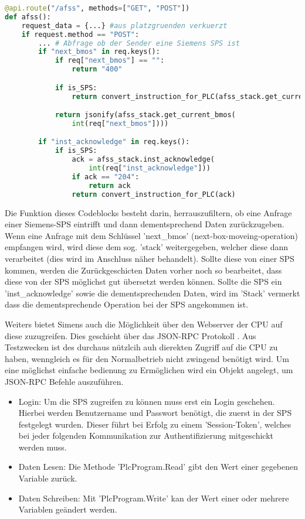 \begin{lstlisting}[language=Python]
@api.route("/afss", methods=["GET", "POST"])
def afss():   
    request_data = {...} #aus platzgruenden verkuerzt
    if request.method == "POST":
        ... # Abfrage ob der Sender eine Siemens SPS ist
        if "next_bmos" in req.keys():
            if req["next_bmos"] == "":
                return "400"

            if is_SPS:
                return convert_instruction_for_PLC(afss_stack.get_current_bmos(int(req["next_bmos"])))

            return jsonify(afss_stack.get_current_bmos(
                int(req["next_bmos"])))

        if "inst_acknowledge" in req.keys():
            if is_SPS:
                ack = afss_stack.inst_acknowledge(
                    int(req["inst_acknowledge"]))
                if ack == "204":
                    return ack
                return convert_instruction_for_PLC(ack)
\end{lstlisting}  

Die Funktion dieses Codeblocks besteht darin, herrauszufiltern, ob eine Anfrage einer Siemens-SPS eintrifft und dann dementsprechend Daten zurückzugeben.
Wenn eine Anfrage mit dem Schlüssel 'next\_bmos' (next-box-moveing-operation) empfangen wird, wird diese dem sog. 'stack' weitergegeben, welcher diese dann verarbeitet (dies wird im Anschluss näher behandelt). Sollte diese von einer SPS kommen, werden die Zurückgeschicten Daten vorher noch so bearbeitet, dass diese von der SPS möglichst gut übersetzt werden können.
Sollte die SPS ein 'inst\_acknowledge' sowie die dementsprechenden Daten, wird im 'Stack' vermerkt dass die dementsprechende Operation bei der SPS angekommen ist.

Weiters bietet Simens auch die Möglichkeit über den Webserver der CPU auf diese zuzugreifen. Dies geschieht über das JSON-RPC Protokoll \cite{ws_s7}. Aus Testzwecken ist des durchaus nützlcih auh dierekten Zugriff auf die CPU zu haben, wenngleich es für den Normalbetrieb nicht zwingend benötigt wird. Um eine möglichst einfache bedienung zu Ermöglichen wird ein Objekt angelegt, um JSON-RPC Befehle auszuführen.

\begin{itemize}
    \item Login: Um die SPS zugreifen zu können muss erst ein Login geschehen. Hierbei werden Benutzername und Passwort benötigt, die zuerst in der SPS festgelegt wurden. Dieser führt bei Erfolg zu einem 'Session-Token', welches bei jeder folgenden Kommunikation zur Authentifizierung mitgeschickt werden muss.
    \item Daten Lesen: Die Methode 'PlcProgram.Read' gibt den Wert einer gegebenen Variable zurück.
    \item Daten Schreiben: Mit 'PlcProgram.Write' kan der Wert einer oder mehrere Variablen geändert werden.
\end{itemize}


